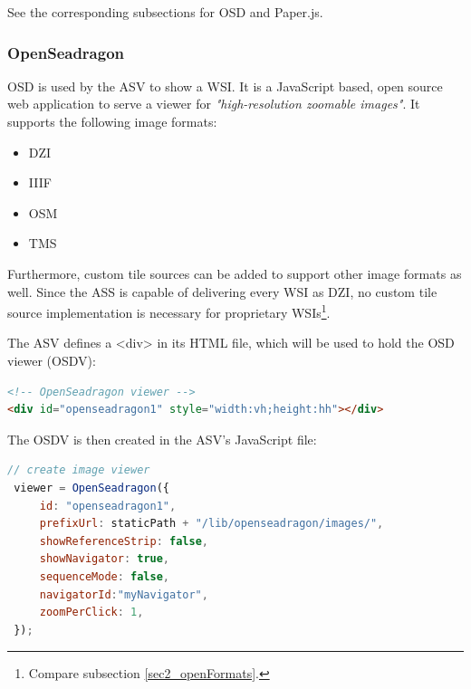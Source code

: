See the corresponding subsections for OSD and Paper.js.

\subsubsection{OpenSeadragon}
OSD is used by the ASV to show a WSI. It is a JavaScript based, open source web application to serve a viewer for \emph{"high-resolution zoomable images"}\cite{web:openseadragon}. It supports the following image formats:

\begin{itemize}
	\item DZI
	\item IIIF
	\item OSM
	\item TMS
\end{itemize}

Furthermore, custom tile sources can be added to support other image formats as well. Since the ASS is capable of delivering every WSI as DZI, no custom tile source implementation is necessary for proprietary WSIs\footnote{
	Compare subsection \ref{sec2_openFormats}.
}.

The ASV defines a \textless{div}{\textgreater} in its HTML file, which will be used to hold the OSD viewer (OSDV):
\begin{lstlisting}[title=as{\textunderscore}viewer.html, frame=single, language=html]
<!-- OpenSeadragon viewer -->
<div id="openseadragon1" style="width:vh;height:hh"></div>
\end{lstlisting}

The OSDV is then created in the ASV's JavaScript file:
\begin{lstlisting}[title=as{\textunderscore}viewer.js, frame=single, language=JavaScript]
 // create image viewer
 viewer = OpenSeadragon({
	 id: "openseadragon1",
	 prefixUrl: staticPath + "/lib/openseadragon/images/",
	 showReferenceStrip: false,
	 showNavigator: true,
	 sequenceMode: false,
	 navigatorId:"myNavigator",
	 zoomPerClick: 1,
 });
\end{lstlisting}

